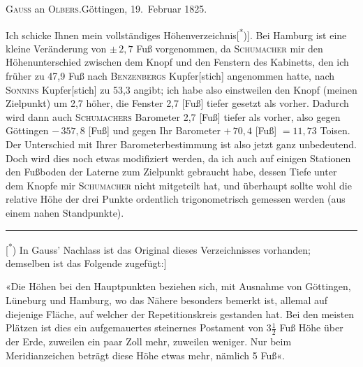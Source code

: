 \begin{center}
\textsc{Gauss} an \textsc{Olbers}.\quad Göttingen, 19.~Februar 1825.
\end{center}

\par\noindent\hspace*{\parindent}Ich schicke Ihnen mein vollständiges Höhenverzeichnis[\textsuperscript{*})].
Bei Hamburg ist eine kleine Veränderung von \(\pm\,2{,}7\) Fuß vorgenommen, da \textsc{Schumacher} mir
den Höhenunterschied zwischen dem Knopf und den Fenstern des Kabinetts,
den ich früher zu 47,9 Fuß nach \textsc{Benzenbergs} Kupfer[stich] angenommen
hatte, nach \textsc{Sonnins} Kupfer[stich] zu 53,3 angibt; ich habe also einstweilen den
Knopf (meinen Zielpunkt) um 2,7 höher, die Fenster 2,7 [Fuß] tiefer gesetzt
als vorher.
Dadurch wird dann auch \textsc{Schumachers} Barometer 2,7 [Fuß] tiefer
als vorher, also gegen Göttingen \(-\,357{,}8\) [Fuß] und gegen Ihr Barometer \(+\,70{,}4\)
[Fuß] \(= 11{,}73\) Toisen.
Der Unterschied mit Ihrer Barometerbestimmung ist
also jetzt ganz unbedeutend.
Doch wird dies noch etwas modifiziert werden, da
ich auch auf einigen Stationen den Fußboden der Laterne zum Zielpunkt
gebraucht habe, dessen Tiefe unter dem Knopfe mir \textsc{Schumacher} nicht mitgeteilt hat,
und überhaupt sollte wohl die relative Höhe der drei Punkte
ordentlich trigonometrisch gemessen werden (aus einem nahen Standpunkte).

\par\smallskip\noindent\rule{.24\linewidth}{.4pt}\par\smallskip
{\footnotesize
\noindent\hspace*{2.75em}[\textsuperscript{*}) In Gauss’ Nachlass ist das Original dieses Verzeichnisses vorhanden; demselben ist das Folgende zugefügt:]\par
\noindent\hspace*{2.75em}«Die Höhen bei den Hauptpunkten beziehen sich, mit Ausnahme von Göttingen, Lüneburg und Hamburg,
wo das Nähere besonders bemerkt ist, allemal auf diejenige Fläche, auf welcher der Repetitionskreis gestanden hat.
Bei den meisten Plätzen ist dies ein aufgemauertes steinernes Postament von 3\(\tfrac{1}{2}\) Fuß Höhe über der Erde,
zuweilen ein paar Zoll mehr, zuweilen weniger.
Nur beim Meridianzeichen beträgt diese Höhe etwas mehr, nämlich 5 Fuß«.\par
}

